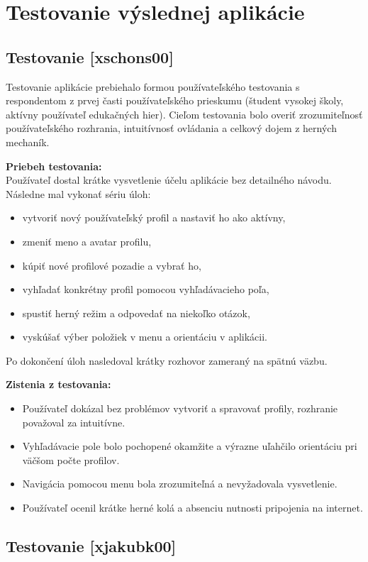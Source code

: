 \documentclass[a4paper,12pt]{article}
\begin{document}
\section{Testovanie výslednej aplikácie}
\subsection{Testovanie [xschons00]}

Testovanie aplikácie prebiehalo formou používateľského testovania s respondentom z prvej časti používateľského prieskumu (študent vysokej školy, aktívny používateľ edukačných hier). Cieľom testovania bolo overiť zrozumiteľnosť používateľského rozhrania, intuitívnosť ovládania a celkový dojem z herných mechaník.

\textbf{Priebeh testovania:}
\\
Používateľ dostal krátke vysvetlenie účelu aplikácie bez detailného návodu. Následne mal vykonať sériu úloh:
\begin{itemize}
	\item vytvoriť nový používateľský profil a nastaviť ho ako aktívny,
	\item zmeniť meno a avatar profilu,
	\item kúpiť nové profilové pozadie a vybrať ho,
	\item vyhľadať konkrétny profil pomocou vyhľadávacieho poľa,
	\item spustiť herný režim a odpovedať na niekoľko otázok,
	\item vyskúšať výber položiek v menu a orientáciu v aplikácii.
\end{itemize}
Po dokončení úloh nasledoval krátky rozhovor zameraný na spätnú väzbu.


\textbf{Zistenia z testovania:}
\begin{itemize}
	\item Používateľ dokázal bez problémov vytvoriť a spravovať profily, rozhranie považoval za intuitívne.
	\item Vyhľadávacie pole bolo pochopené okamžite a výrazne uľahčilo orientáciu pri väčšom počte profilov.
	\item Navigácia pomocou menu bola zrozumiteľná a nevyžadovala vysvetlenie.
	\item Používateľ ocenil krátke herné kolá a absenciu nutnosti pripojenia na internet.
\end{itemize}


\subsection{Testovanie [xjakubk00]}
\end{document}
